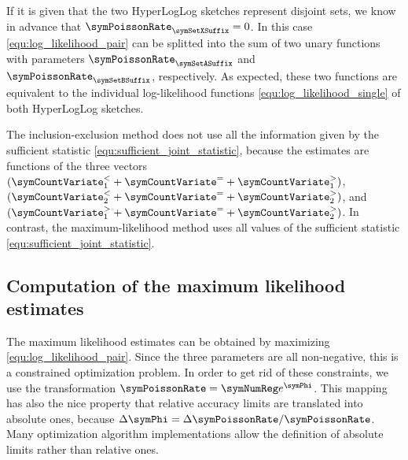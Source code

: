 \documentclass[a4paper]{scrartcl}
\begin{document}
If it is given that the two HyperLogLog sketches represent disjoint sets, we know in advance that $\symPoissonRate_\symSetXSuffix=0$. In this case \eqref{equ:log_likelihood_pair} can be splitted into the sum of two unary functions with parameters $\symPoissonRate_\symSetASuffix$ and $\symPoissonRate_\symSetBSuffix$, respectively. As expected, these two functions are equivalent to the individual log-likelihood functions \eqref{equ:log_likelihood_single} of both HyperLogLog sketches.

The inclusion-exclusion method does not use all the information given by the sufficient statistic \eqref{equ:sufficient_joint_statistic}, because the estimates are functions of the three vectors $(\boldsymbol\symCountVariate^{<}_{1} + \boldsymbol\symCountVariate^{=} + \boldsymbol\symCountVariate^{>}_{1})$, 
$(\boldsymbol\symCountVariate^{<}_{2} + \boldsymbol\symCountVariate^{=} + \boldsymbol\symCountVariate^{>}_{2})$, and 
$(\boldsymbol\symCountVariate^{>}_{1} + \boldsymbol\symCountVariate^{=} + \boldsymbol\symCountVariate^{>}_{2})$. In contrast, the maximum-likelihood method uses all values of the sufficient statistic \eqref{equ:sufficient_joint_statistic}.

\subsection{Computation of the maximum likelihood estimates}
The maximum likelihood estimates can be obtained by maximizing \eqref{equ:log_likelihood_pair}. Since the three parameters are all non-negative, this is a constrained optimization problem. In order to get rid of these constraints, we use the transformation $\symPoissonRate=\symNumReg e^{\symPhi}$. This mapping has also the nice property that relative accuracy limits are translated into absolute ones, because $\Delta\symPhi = \Delta\symPoissonRate/\symPoissonRate$. Many optimization algorithm implementations allow the definition of absolute limits rather than relative ones.
\end{document}
